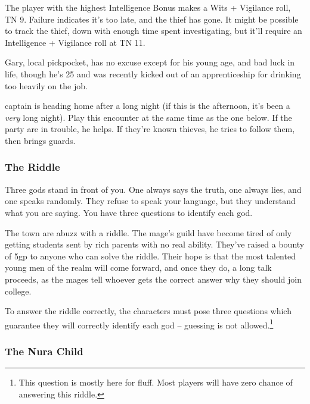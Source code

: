 The player with the highest Intelligence Bonus makes a Wits + Vigilance roll, TN 9.  Failure indicates it's too late, and the thief has gone.  It might be possible to track the thief, down with enough time spent investigating, but it'll require an Intelligence + Vigilance roll at TN 11.

Gary, local pickpocket, has no excuse except for his young age, and bad luck in life, though he's 25 and was recently kicked out of an apprenticeship for drinking too heavily on the job.

\humanthief


\Gls{captain} is heading home after a long night (if this is the afternoon, it's been a \emph{very} long night).  Play this encounter at the same time as the one below.  If the party are in trouble, he helps.  If they're known thieves, he tries to follow them, then brings guards.



\subsubsection{The Riddle}

\begin{boxtext}
Three gods stand in front of you.  One always says the truth, one always lies, and one speaks randomly.  They refuse to speak your language, but they understand what you are saying.  You have three questions to identify each god.
\end{boxtext}

The town are abuzz with a riddle.  The mage's guild have become tired of only getting students sent by rich parents with no real ability.  They've raised a bounty of 5gp to anyone who can solve the riddle.  Their hope is that the most talented young men of the realm will come forward, and once they do, a long talk proceeds, as the mages tell whoever gets the correct answer why they should join \gls{college}.

To answer the riddle correctly, the characters must pose three questions which guarantee they will correctly identify each god -- guessing is not allowed.\footnote{This question is mostly here for fluff.  Most players will have zero chance of answering this riddle.}

\subsubsection{The Nura Child}

